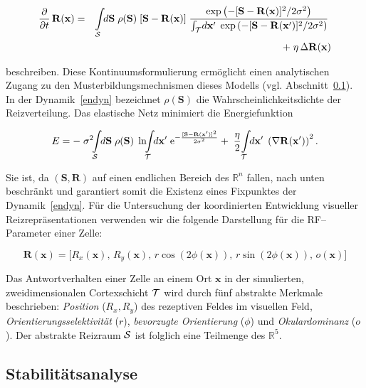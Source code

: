 \begin{eqnarray}
\frac{\partial}{\partial t}\, \mathbf{R(x)} &=&\int\limits_{\cal
S}\!\!d\mathbf{S}\; \rho(\mathbf{S})\; [\mathbf{S-R(x)}]\;
\frac{\exp\left(-[\mathbf{S-R(x)}]^2/2\sigma^2\right)}{\int_{\cal T}
\!d\mathbf{x}^\prime\; \exp\left(-[\mathbf{S-R(\mathbf{x}^\prime)}]^2/2\sigma^2\right)}\;\nonumber\\
&&+\;\eta\,\Delta\mathbf{R(x)}
\label{endyn}
\end{eqnarray}

beschreiben. Diese Kontinuumsformulierung ermöglicht einen analytischen
Zugang zu den Musterbildungsmechnismen dieses Modells
(vgl. Abschnitt~\ref{stabilitaet}).  In der Dynamik~\eqref{endyn}
bezeichnet $\rho(\mathbf{S})$ die Wahrscheinlichkeitsdichte der
Reizverteilung. Das elastische Netz minimiert die Energiefunktion

\begin{equation}
E=-\; \sigma^2\!\!\int\limits_{\cal S}\!\!d\mathbf{S}\; \rho(\mathbf{S})\;
\ln\!\!\int\limits_{\cal T}\!\!d\mathbf{x}^\prime\;
\text{e}^{-\frac{[\mathbf{S-R(\mathbf{x}^\prime)}]^2}{2\sigma^2}}+\;
\frac{\eta}{2}\!\int\limits_{\cal T}\!\!d\mathbf{x}^\prime\;
\left(\nabla\mathbf{R(\mathbf{x}^\prime)}\right)^2.
\label{energie}
\end{equation}

Sie ist, da $(\mathbf{S,R})$ auf einen endlichen Bereich des $\mathbb{R}^n$
fallen, nach unten beschränkt und garantiert somit die Existenz eines
Fixpunktes der Dynamik~\eqref{endyn}.  Für die Untersuchung der
koordinierten Entwicklung visueller Reizrepräsentationen verwenden wir die
folgende Darstellung für die RF--Parameter einer Zelle:

\begin{equation*}
\mathbf{R(x)} = \bigl[R_x(\mathbf{x}),\, R_y(\mathbf{x}),\,
r\cos(2\phi(\mathbf{x})),\, r\sin(2\phi(\mathbf{x})),\, o(\mathbf{x})\bigr]
\end{equation*}

Das Antwortverhalten einer Zelle an einem Ort $\mathbf{x}$ in der
simulierten, zweidimensionalen Cortexschicht $\cal T$ wird durch
fünf abstrakte Merkmale beschrieben: \emph{Position} ($R_x,R_y$) des
rezeptiven Feldes im visuellen Feld, \emph{Orientierungsselektivität}
($r$), \emph{bevorzugte Orientierung} ($\phi$) und \emph{Okulardominanz}
($o$).  Der abstrakte Reizraum ${\cal S}$ ist folglich eine Teilmenge
des $\mathbb{R}^5$.

\subsection{Stabilitätsanalyse}
\label{stabilitaet}

